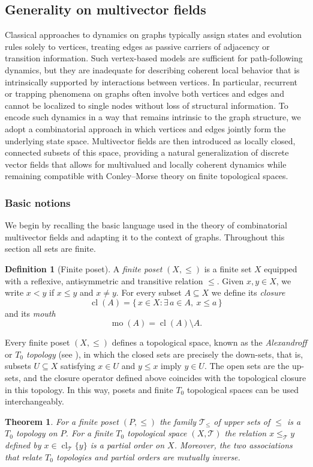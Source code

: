 \documentclass{article}
\theoremstyle{definition}
\newtheorem{definition}{Definition}
\theoremstyle{plain}
\newtheorem{theorem}{Theorem}
\theoremstyle{remark}
\newcommand{\1}{\mathbbm{1}}  %
\newcommand{\cl}{\operatorname{cl}}
\def\cT{\text{$\mathcal T$}}
\begin{document}
\subsection{Generality on multivector fields} 
Classical approaches to dynamics on graphs typically assign states and evolution rules solely to vertices, treating edges as passive carriers of adjacency or transition information. Such vertex-based models are sufficient for path-following dynamics, but they are inadequate for describing coherent local behavior that is intrinsically supported by interactions between vertices. In particular, recurrent or trapping phenomena on graphs often involve both vertices and edges and cannot be localized to single nodes without loss of structural information. To encode such dynamics in a way that remains intrinsic to the graph structure, we adopt a combinatorial approach in which vertices and edges jointly form the underlying state space. Multivector fields are then introduced as locally closed, connected subsets of this space, providing a natural generalization of discrete vector fields that allows for multivalued and locally coherent dynamics while remaining compatible with Conley--Morse theory on finite topological spaces.

\subsubsection{Basic notions}

We begin by recalling the basic language used in the theory of
combinatorial multivector fields and adapting it to the context of graphs.
Throughout this section all sets are finite.

\begin{definition}[Finite poset]
A \emph{finite poset} $(X,\leq)$ is a finite set $X$ equipped with a
reflexive, antisymmetric and transitive relation $\leq$.  Given
$x,y\in X$, we write $x<y$ if $x\leq y$ and $x\neq y$.
For every subset $A\subseteq X$ we define its \emph{closure}
\[
\operatorname{cl}(A) = \{\,x\in X : \exists\,a\in A,\ x\leq a\,\}
\]
and its \emph{mouth}
\[
\operatorname{mo}(A) = \operatorname{cl}(A)\setminus A.
\]
\end{definition}

Every finite poset $(X,\leq)$ defines a topological space, known as the
\emph{Alexandroff} or \emph{$T_0$ topology} (see \cite{Alexandroff_ftop}), in which the closed sets are
precisely the down-sets, that is, subsets $U\subseteq X$ satisfying
$x\in U$ and $y\leq x$ imply $y\in U$.  The open sets are the up-sets,
and the closure operator defined above coincides with the topological
closure in this topology.  In this way, posets and finite $T_0$
topological spaces can be used interchangeably.
\begin{theorem}\label{thm:finite_top} \cite{Alexandroff_ftop}
For a finite poset $(P,\leq)$ the family $\cT_{\leq}$ of upper sets of $\leq$ is a $T_0$ topology on $P$. For a finite $T_0$ topological space $(X,\cT)$ the relation $x \leq_{\cT} y$ defined by $x \in \cl_{\cT} \{ y \}$ is a partial order on $X$. Moreover, the two associations that relate $T_0$ topologies and partial orders are mutually inverse.
    
\end{theorem}
\end{document}
